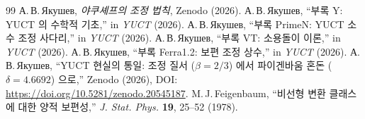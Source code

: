 \documentclass[12pt,a4paper]{article}
\begin{document}
	\begin{thebibliography}{99}
		 А.\,В.\,Якушев, \emph{야쿠셰프의 조정 법칙}, Zenodo (2026).
		 А.\,В.\,Якушев, ``부록 Y: YUCT 의 수학적 기초,'' in \emph{YUCT} (2026).
		 А.\,В.\,Якушев, ``부록 PrimeN: YUCT 소수 조정 사다리,'' in \emph{YUCT} (2026).
		 А.\,В.\,Якушев, ``부록 VT: 소용돌이 이론,'' in \emph{YUCT} (2026).
		 А.\,В.\,Якушев, ``부록 Ferra1.2: 보편 조정 상수,'' in \emph{YUCT} (2026).
		 А.\,В.\,Якушев, ``YUCT 현실의 통일: 조정 질서 ($\beta=2/3$) 에서 파이겐바움 혼돈 ($\delta=4.6692$) 으로,'' Zenodo (2026), DOI: \url{https://doi.org/10.5281/zenodo.20545187}.
		 M.\,J.\,Feigenbaum, ``비선형 변환 클래스에 대한 양적 보편성,'' \emph{J. Stat. Phys.} \textbf{19}, 25--52 (1978).
	\end{thebibliography}
	
\end{document}

